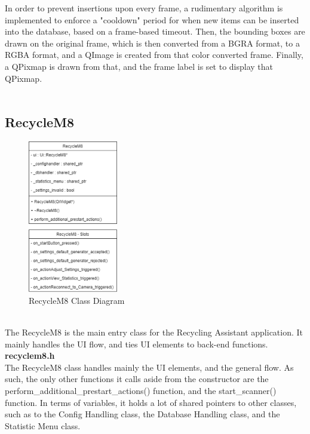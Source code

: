 \documentclass[conference]{IEEEtran}
\begin{document}
In order to prevent insertions upon every frame, a rudimentary algorithm is implemented to enforce a "cooldown" period for when new items can be inserted into the database, based on a frame-based timeout. Then, the bounding boxes are drawn on the original frame, which is then converted from a BGRA format, to a RGBA format, and a QImage is created from that color converted frame. Finally, a QPixmap is drawn from that, and the frame label is set to display that QPixmap.~\\~\\

\subsection{RecycleM8}

\begin{figure}[h]
    \centering
    \includegraphics[width=0.35\textwidth]{images/code_diagrams/recyclem8.eps}
    \caption{RecycleM8 Class Diagram}
\end{figure}~\\

The RecycleM8 is the main entry class for the Recycling Assistant application. It mainly handles the UI flow, and ties UI elements to back-end functions.\\


\textbf{recyclem8.h}~\\

The RecycleM8 class handles mainly the UI elements, and the general flow. As such, the only other functions it calls aside from the constructor are the perform\_additional\_prestart\_actions() function, and the start\_scanner() function. In terms of variables, it holds a lot of shared pointers to other classes, such as to the Config Handling class, the Database Handling class, and the Statistic Menu class.\\
\end{document}
